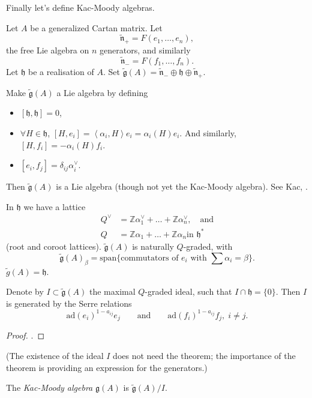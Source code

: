 \medskip\noindent
Finally let's define Kac-Moody algebras.

Let $A$ be a generalized Cartan matrix. Let
$$
\tilde{\mathfrak{n}}_+=F(e_1,\ldots,e_n),
$$
the free Lie algebra on $n$ generators, and
similarly
$$
\tilde{\mathfrak{n}}_-=F(f_1,\ldots,f_n).
$$
Let $\mathfrak{h}$ be a realisation of $A$.
Set $\tilde{\mathfrak{g}}(A)
=\tilde{\mathfrak{n}}_- \oplus \mathfrak{h}
\oplus \tilde{\mathfrak{n}}_+$.

Make $\tilde{\mathfrak{g}}(A)$ a Lie algebra
by defining
\begin{itemize}
\item $[\mathfrak{h},\mathfrak{h}]=0$,
\item $\forall  H \in \mathfrak{h}$,
$[H,e_i]=\left\langle{}\alpha_i,H\right\rangle{}e_i
=\alpha_i(H)e_i$. And similarly,
$[H,f_i]=-\alpha_i(H)f_i$.
\item $[e_i,f_j]=\delta_{ij}\alpha_i^\vee$.
\end{itemize}
Then $\tilde{\mathfrak{g}}(A)$ is a Lie
algebra (though not yet the Kac-Moody
algebra). See Kac, \cite[Thorem 1.2]{IDLA}.

\begin{remark}
\label{remark-lattice}
In $\mathfrak{h}$ we have a lattice
$$
\begin{aligned}
Q^\vee&=\mathbb{Z}\alpha_1^\vee+\ldots+
\mathbb{Z}\alpha_n^\vee,\quad
\text{and}\\
Q&=\mathbb{Z}\alpha_1+\ldots+\mathbb{Z}
\alpha_n\text{
in }\mathfrak{h}^*
\end{aligned}
$$
(root and coroot lattices).
$\tilde{\mathfrak{g}}(A)$ is naturally
$Q$-graded,
with
$$
\tilde{\mathfrak{g}}(A)_\beta=\text{span}\{
\text{commutators of $e_i$ with $\sum
\alpha_i=\beta$}\}.
$$
$\tilde{g}(A)=\mathfrak{h}$.

\begin{theorem}
\label{theorem-Gabber-Kac}
Denote by $I \subset \tilde{\mathfrak{g}}(A)$
the maximal $Q$-graded ideal, such
that $I \cap\mathfrak{h}=\{0\}$.
Then $I$ is generated by the Serre relations
$$
\text{ad}(e_i)^{1-a_{ij}}e_j\qquad
\text{and}\qquad
\text{ad}(f_i)^{1-a_{ij}}f_j,\; i\neq j.
$$
\end{theorem}

\begin{proof}
\cite[Theorem 9.11]{IDLA}.
\end{proof}

(The existence of the ideal $I$ does not need
the theorem;
the importance of the theorem is providing an
expression for the generators.)

\begin{definition}
\label{definition-Kac-Moody-algebra}
The {\it Kac-Moody algebra} $\mathfrak{g}(A)$
is $\tilde{\mathfrak{g}}(A)/I$.
\end{definition}

\end{remark}

